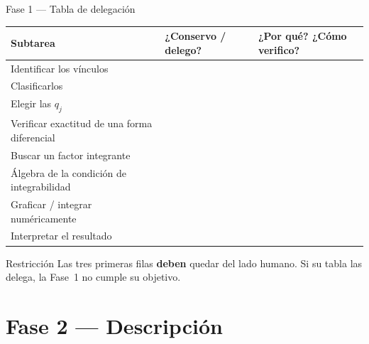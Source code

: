 \documentclass[10pt,aspectratio=169]{beamer}
\begin{document}
\begin{frame}{Fase 1 --- Tabla de delegación}
  \small
  \begin{table}
  \begin{tabular}{@{}p{6.4cm}p{2.4cm}p{4.6cm}@{}}
    \toprule
    \textbf{Subtarea} & \textbf{¿Conservo / delego?} & \textbf{¿Por qué? ¿Cómo verifico?} \\
    \midrule
    Identificar los vínculos & & \\
    Clasificarlos & & \\
    Elegir las $q_j$ & & \\
    Verificar exactitud de una forma diferencial & & \\
    Buscar un factor integrante & & \\
    Álgebra de la condición de integrabilidad & & \\
    Graficar / integrar numéricamente & & \\
    Interpretar el resultado & & \\
    \bottomrule
  \end{tabular}
  \end{table}
  \begin{alertblock}{Restricción}
    Las tres primeras filas \textbf{deben} quedar del lado humano. Si su tabla las delega, la Fase~1 no cumple su objetivo.
  \end{alertblock}
\end{frame}

\section{Fase 2 --- Descripción}
\end{document}
